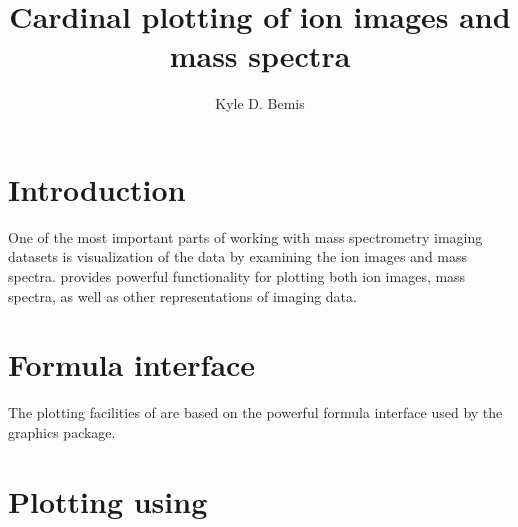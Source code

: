 \documentclass{article}
\title{Cardinal plotting of ion images and mass spectra}
\author{Kyle D. Bemis}
\begin{document}


\maketitle

\tableofcontents

\section{Introduction}

One of the most important parts of working with mass spectrometry imaging datasets is visualization of the data by examining the ion images and mass spectra.  provides powerful functionality for plotting both ion images, mass spectra, as well as other representations of imaging data.

\section{Formula interface}

The plotting facilities of  are based on the powerful formula interface used by the  graphics package.

\section{Plotting using }
\end{document}
